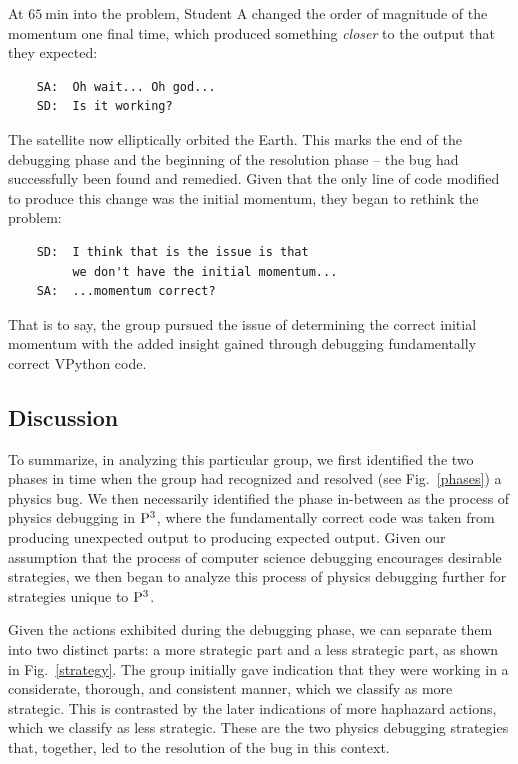 \documentclass{msuphddissertation}
\begin{document}
\begin{doublespace}
At $\SI{65}{\minute}$ into the problem, Student A changed the order of magnitude of the momentum one final time, which produced something \emph{closer} to the output that they expected:  \begin{verbatim}
    SA:  Oh wait... Oh god...
    SD:  Is it working?
\end{verbatim}  The satellite now elliptically orbited the Earth.  This marks the end of the debugging phase and the beginning of the resolution phase -- the bug had successfully been found and remedied.  Given that the only line of code modified to produce this change was the initial momentum, they began to rethink the problem:  \begin{verbatim}
    SD:  I think that is the issue is that 
         we don't have the initial momentum...
    SA:  ...momentum correct?
\end{verbatim}  That is to say, the group pursued the issue of determining the correct initial momentum with the added insight gained through debugging fundamentally correct VPython code.

\subsection{Discussion}

To summarize, in analyzing this particular group, we first identified the two phases in time when the group had recognized and resolved (see Fig.~\ref{phases}) a physics bug.  We then necessarily identified the phase in-between as the process of physics debugging in ${\rm P}^{3}$, where the fundamentally correct code was taken from producing unexpected output to producing expected output.  Given our assumption that the process of computer science debugging encourages desirable strategies, we then began to analyze this process of physics debugging further for strategies unique to ${\rm P}^{3}$.

Given the actions exhibited during the debugging phase, we can separate them into two distinct parts: a more strategic part and a less strategic part, as shown in Fig.~\ref{strategy}.  The group initially gave indication that they were working in a considerate, thorough, and consistent manner, which we classify as more strategic.  This is contrasted by the later indications of more haphazard actions, which we classify as less strategic.  These are the two physics debugging strategies that, together, led to the resolution of the bug in this context.


\end{doublespace}
\end{document}
